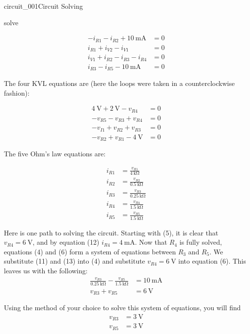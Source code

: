 \begin{mainquestion}{circuit_001}{Circuit Solving}
\begin{partquestion}{solve}
\begin{answer}
\begin{align}
-i_{R1}-i_{R2}+\qty{10}{\milli\ampere} &= 0 \\
i_{R1}+i_{V2}-i_{V1} &= 0 \\
i_{V1}+i_{R2}-i_{R3}-i_{R4} &= 0 \\
i_{R3}-i_{R5}-\qty{10}{\milli\ampere} &= 0
\end{align}

The four KVL equations are (here the loops were taken in a counterclockwise fashion):

\begin{align}
\qty{4}{\volt}+\qty{2}{\volt}-v_{R4} &= 0 \\
-v_{R5}-v_{R3}+v_{R4} &= 0 \\
-v_{I1}+v_{R2}+v_{R3} &= 0 \\
-v_{R2}+v_{R1}-\qty{4}{\volt} &= 0
\end{align}

The five Ohm's law equations are:

\begin{align}
i_{R1} &= \frac{v_{R1}}{\qty{4}{\kilo\ohm}} \\
i_{R2} &= \frac{v_{R2}}{\qty{0.5}{\kilo\ohm}} \\
i_{R3} &= \frac{v_{R3}}{\qty{0.25}{\kilo\ohm}} \\
i_{R4} &= \frac{v_{R4}}{\qty{1.5}{\kilo\ohm}} \\
i_{R5} &= \frac{v_{R5}}{\qty{1.5}{\kilo\ohm}}
\end{align}

Here is one path to solving the circuit. Starting with (5), it is clear that
$v_{R4}=\qty{6}{\volt}$, and by equation (12)
$i_{R4}=\qty{4}{\milli\ampere}$. Now that $R_4$ is fully solved, equations (4) and (6) form a system of equations between $R_3$ and $R_5$. We substitute (11) and (13) into (4) and substitute $v_{R4}=\qty{6}{\volt}$ into equation (6). This leaves us with the following:
\begin{align*}
\frac{v_{R3}}{\qty{0.25}{\kilo\ohm}}
-
\frac{v_{R5}}{\qty{1.5}{\kilo\ohm}}
&=
\qty{10}{\milli\ampere} \\
v_{R3}+v_{R5}
&=
\qty{6}{\volt}
\end{align*}

Using the method of your choice to solve this system of equations, you will find
\begin{align*}
v_{R3} &= \qty{3}{\volt} \\
v_{R5} &= \qty{3}{\volt}
\end{align*}


\end{answer}
\end{partquestion}
\end{mainquestion}

